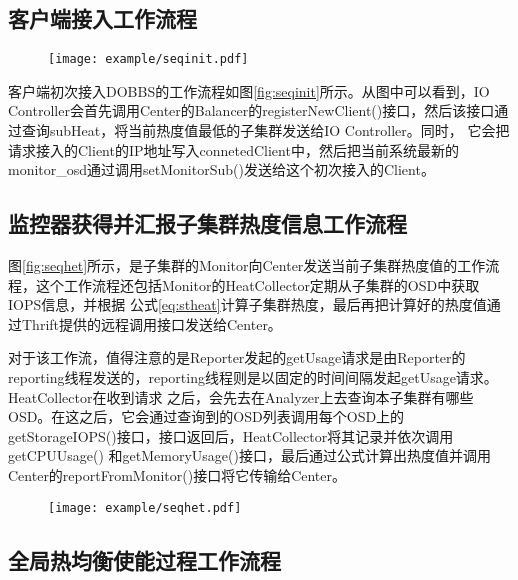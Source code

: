 \subsection{客户端接入工作流程}
\begin{figure}[!htp]
    \centering
    \texttt{[image: example/seqinit.pdf]}
\end{figure}

客户端初次接入DOBBS的工作流程如图\ref{fig:seqinit}所示。从图中可以看到，IO Controller会首先调用Center的Balancer的registerNewClient()接口，然后该接口通过查询subHeat，将当前热度值最低的子集群发送给IO Controller。同时，
它会把请求接入的Client的IP地址写入connetedClient中，然后把当前系统最新的monitor\_osd通过调用setMonitorSub()发送给这个初次接入的Client。

\subsection{监控器获得并汇报子集群热度信息工作流程}

图\ref{fig:seqhet}所示，是子集群的Monitor向Center发送当前子集群热度值的工作流程，这个工作流程还包括Monitor的HeatCollector定期从子集群的OSD中获取IOPS信息，并根据
公式\ref{eq:stheat}计算子集群热度，最后再把计算好的热度值通过Thrift提供的远程调用接口发送给Center。

对于该工作流，值得注意的是Reporter发起的getUsage请求是由Reporter的reporting线程发送的，reporting线程则是以固定的时间间隔发起getUsage请求。HeatCollector在收到请求
之后，会先去在Analyzer上去查询本子集群有哪些OSD。在这之后，它会通过查询到的OSD列表调用每个OSD上的getStorageIOPS()接口，接口返回后，HeatCollector将其记录并依次调用getCPUUsage()
和getMemoryUsage()接口，最后通过公式计算出热度值并调用Center的reportFromMonitor()接口将它传输给Center。

\begin{figure}[!htp]
    \centering
    \texttt{[image: example/seqhet.pdf]}
\end{figure}

\subsection{全局热均衡使能过程工作流程}


